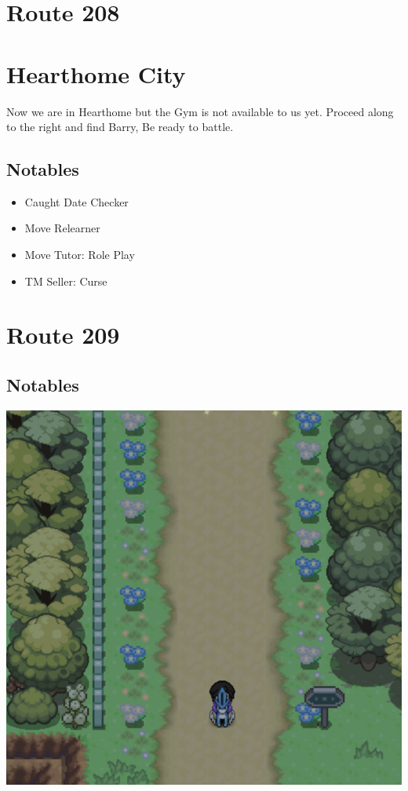 \documentclass[11pt]{article}
\begin{document}
\section{Route 208}\label{sec:Route_208}



\section{Hearthome City}
Now we are in Hearthome but the Gym is not available to us yet.
Proceed along to the right and find Barry, Be ready to battle.

\subsection{Notables}\label{subsec:notables-hearthome}

\begin{itemize}
    \item Caught Date Checker
    \item Move Relearner
    \item Move Tutor: Role Play
    \item TM Seller: Curse
\end{itemize}

\section{Route 209}\label{sec:Route_209}

\subsection{Notables}\label{subsec:notables-route-209}

\includegraphics[width=\textwidth]{walkthrough/Sinnoh/Route_209}
\end{document}
